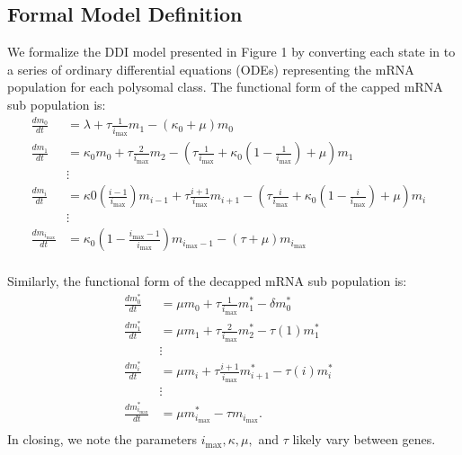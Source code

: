 \documentclass[review]{elsarticle}
\newcommand{\imax}{\ensuremath{{i_{\max}}}\xspace}
\begin{document}
\subsection{Formal Model Definition}
We formalize the DDI model presented in Figure 1 by converting each state in to a series of ordinary differential equations (ODEs) representing the mRNA population for each polysomal class. 
The functional form of the capped mRNA sub population is:
\begin{align} \label{eq:Capped_ODE}
\frac{dm_{0}}{dt} &= \lambda+ \tau \frac{1}{\imax}m_{1}-\left(\kappa_0 + \mu\right)m_{0} \\ \nonumber
\frac{dm_{1}}{dt} &= \kappa_0 m_{0}+ \tau \frac{2}{\imax}m_{2}-\left( \tau \frac{1}{\imax}+\kappa_0\left(1-\frac{1}{\imax}\right)+\mu\right) m_{1}\\ \nonumber
& \vdots & \\ \nonumber
\frac{dm_{i}}{dt} &= \kappa0 \left(\frac{i-1}{\imax}\right) m_{i-1}+ \tau \frac{i+1}{\imax}m_{i+1}-\left( \tau \frac{i}{\imax}+\kappa_0\left(1-\frac{i}{\imax}\right)+\mu\right) m_{i} \\ \nonumber
& \vdots & \\ \nonumber
\frac{dm_{\imax}}{dt} &= \kappa_0\left(1-\frac{\imax-1}{\imax}\right)m_{\imax-1}-\left( \tau +\mu\right) m_{\imax}\\ \nonumber
\end{align}

Similarly, the functional form of the decapped mRNA sub population is: 
\begin{align}\label{eq:Decapped_ODE}
\frac{dm_{0}^{*}}{dt} &= \mu m_{0}+ \tau \frac{1}{\imax}m_{1}^{*}-\delta m_{0}^{*} \\ \nonumber
\frac{dm_{1}^{*}}{dt} &= \mu m_{1}+ \tau \frac{2}{\imax}m_{2}^{*}-\tau(1)m_{1}^{*} \\ \nonumber
& \vdots & \\ \nonumber
\frac{dm_{i}^{*}}{dt} &= \mu m_{i}+ \tau \frac{i+1}{\imax}m_{i+1}^{*}-\tau(i)m_{i}^{*} \\ \nonumber
& \vdots & \\ \nonumber
\frac{dm_{\imax}^{*}}{dt} &= \mu m_{\imax}^{*}- \tau m_{\imax}. \\ \nonumber
\end{align}
In closing, we note the parameters $\imax, \kappa, \mu,$ and $\tau$ likely vary between genes.
\end{document}
